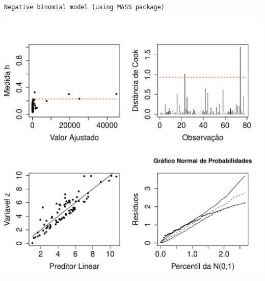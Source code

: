 \documentclass[12pt,a4paper]{article}\usepackage[]{graphicx}\usepackage[]{color}
\makeatletter
\def\maxwidth{ %
  \ifdim\Gin@nat@width>\linewidth
    \linewidth
  \else
    \Gin@nat@width
  \fi
}
\newenvironment{kframe}{%
 \def\at@end@of@kframe{}%
 \ifinner\ifhmode%
  \def\at@end@of@kframe{\end{minipage}}%
  \begin{minipage}{\columnwidth}%
 \fi\fi%
 \def\FrameCommand##1{\hskip\@totalleftmargin \hskip-\fboxsep
 \colorbox{shadecolor}{##1}\hskip-\fboxsep
     \hskip-\linewidth \hskip-\@totalleftmargin \hskip\columnwidth}%
 \MakeFramed {\advance\hsize-\width
   \@totalleftmargin\z@ \linewidth\hsize
   \@setminipage}}%
 {\par\unskip\endMakeFramed%
 \at@end@of@kframe}
\newenvironment{knitrout}{}{} %
\makeatother
\begin{document}
\begin{knitrout}
\color{fgcolor}\begin{kframe}
\begin{verbatim}
Negative binomial model (using MASS package) 
\end{verbatim}
\end{kframe}
\includegraphics[width=\maxwidth]{figure/unnamed-chunk-14-1} 

\end{knitrout}
\end{document}
